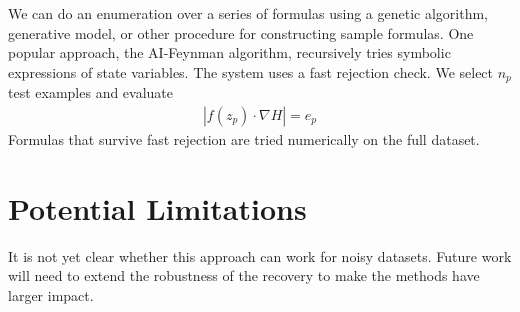 \documentclass[book.tex]{subfiles}
\begin{document}
We can do an enumeration over a series of formulas using a genetic algorithm, generative model, or other procedure for constructing sample formulas. %
One popular approach, the AI-Feynman algorithm, recursively tries symbolic expressions of state variables. The system uses a fast rejection check. We select $n_p$ test examples and evaluate
\begin{align}
    |f(z_p) \cdot \nabla H| = e_p
\end{align}
Formulas that survive fast rejection are tried numerically on the full dataset. 


\section{Potential Limitations}
It is not yet clear whether this approach can work for noisy datasets. Future work will need to extend the robustness of the recovery to make the methods have larger impact.
\end{document}
